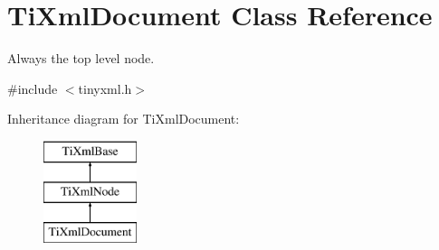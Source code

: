 \hypertarget{class_ti_xml_document}{
\section{TiXmlDocument Class Reference}
\label{class_ti_xml_document}
}


Always the top level node.  




{\ttfamily \#include $<$tinyxml.h$>$}

Inheritance diagram for TiXmlDocument:\begin{figure}[H]
\begin{center}
\leavevmode
\includegraphics[height=3.000000cm]{class_ti_xml_document}
\end{center}
\end{figure}
